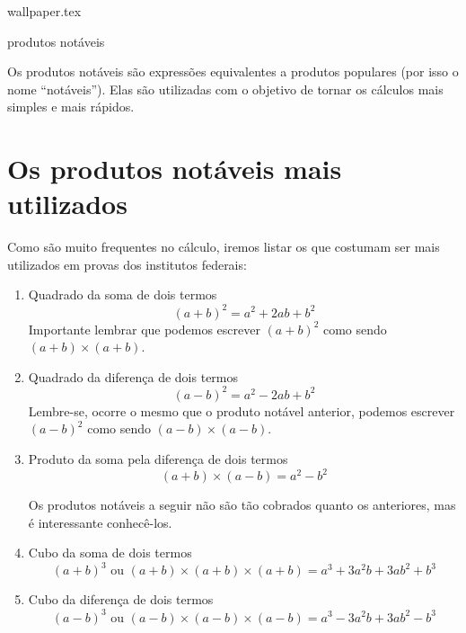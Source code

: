 \documentclass[fleqn,10pt]{article}
\begin{document}
    {wallpaper.tex} %
        \begin{center}
            {\LARGE {\sc produtos notáveis}}
        \end{center}


\begin{definicao}
    Os produtos notáveis são expressões equivalentes a produtos populares (por isso o nome ``notáveis''). Elas são utilizadas com o objetivo de tornar os cálculos mais simples e mais rápidos.
\end{definicao}
\section*{Os produtos notáveis mais utilizados}
 Como são muito frequentes no cálculo, iremos listar os que costumam ser mais utilizados em provas dos institutos federais:

    \begin{enumerate}[label=\textbf{(\Roman*)}]
        \item Quadrado da soma de dois termos
            \[ (a+b)^2 = a^2 + 2ab + b^2\]
            Importante lembrar que podemos escrever \( (a+b)^2\) como sendo \( (a+b) \times (a+b) \).
        \item Quadrado da diferença de dois termos
            \[ (a-b)^2 = a^2 - 2ab + b^2\]
            Lembre-se, ocorre o mesmo que o produto notável anterior, podemos escrever \( (a-b)^2\) como sendo \( (a-b) \times (a-b) \).
        \item Produto da soma pela diferença de dois termos
            \[ (a+b) \times (a-b)= a^2-b^2 \]
        
        \begin{obs}
        Os produtos notáveis a seguir não são tão cobrados quanto os anteriores, mas é interessante conhecê-los.
        \end{obs}
        \item Cubo da soma de dois termos
            \[ (a+b)^3 \textrm{ ou } (a+b) \times (a+b) \times (a+b) = a^3 + 3a^{2}b + 3ab^2 + b^3 \]
        \item Cubo da diferença de dois termos
            \[ (a-b)^3 \textrm{ ou } (a-b) \times (a-b) \times (a-b) = a^3-3a^{2}b + 3ab^2 - b^3 \]
    \end{enumerate}
    
\end{document}
